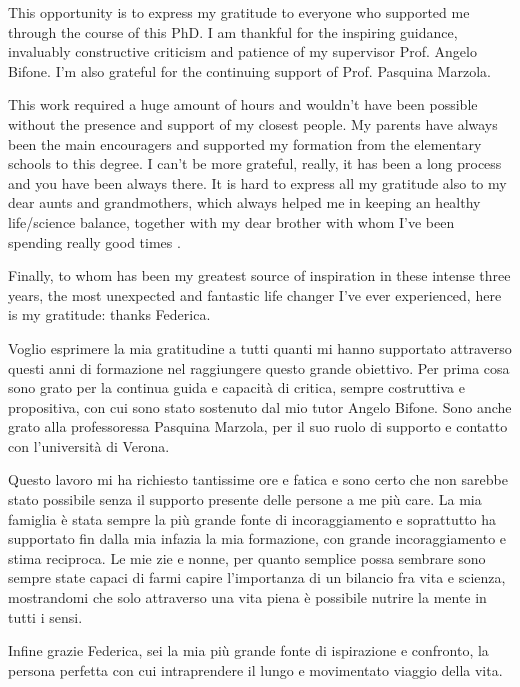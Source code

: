 This opportunity is to express my gratitude to everyone who supported me through the course of this PhD.
I am thankful for the inspiring guidance, invaluably constructive criticism and patience of my supervisor Prof. Angelo Bifone.
I'm also grateful for the continuing support of Prof. Pasquina Marzola.

This work required a huge amount of hours and wouldn't have been possible without the presence and support of my closest people.
My parents have always been the main encouragers and supported my formation from the elementary schools to this degree. I can't be more grateful, really, it has been a long process and you have been always there.
It is hard to express all my gratitude also to my dear aunts and grandmothers, which always helped me in keeping an healthy life/science balance, together with my dear brother with whom I've been spending really good times .

Finally, to whom has been my greatest source of inspiration in these intense three years, the most unexpected and fantastic life changer I've ever experienced, here is my gratitude: thanks Federica.

\vspace*{\fill}

Voglio esprimere la mia gratitudine a tutti quanti mi hanno supportato attraverso questi anni di formazione nel raggiungere questo grande obiettivo.
Per prima cosa sono grato per la continua guida e capacità di critica, sempre costruttiva e propositiva, con cui sono stato sostenuto dal mio tutor Angelo Bifone.
Sono anche grato alla professoressa Pasquina Marzola, per il suo ruolo di supporto e contatto con l'università di Verona.

Questo lavoro mi ha richiesto tantissime ore e fatica e sono certo che non sarebbe stato possibile senza il supporto presente delle persone a me più care.
La mia famiglia è stata sempre la più grande fonte di incoraggiamento e soprattutto ha supportato fin dalla mia infazia la mia formazione, con grande incoraggiamento e stima reciproca.
Le mie zie e nonne, per quanto semplice possa sembrare sono sempre state capaci di farmi capire l'importanza di un bilancio fra vita e scienza, mostrandomi che solo attraverso una vita piena è possibile nutrire la mente in tutti i sensi.

Infine grazie Federica, sei la mia più grande fonte di ispirazione e confronto, la persona perfetta con cui intraprendere il lungo e movimentato viaggio della vita.
